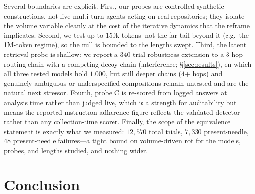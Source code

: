 \documentclass[11pt]{article}
\begin{document}
Several boundaries are explicit. First, our probes are controlled synthetic
constructions, not live multi-turn agents acting on real repositories; they isolate
the volume variable cleanly at the cost of the iterative dynamics that the reframe
implicates. Second, we test up to $150$k tokens, not the far tail beyond it
(e.g.\ the 1M-token regime), so the null is bounded to the lengths swept. Third, the
latent retrieval probe is shallow: we report a $340$-trial robustness extension to a
$3$-hop routing chain with a competing decoy chain (interference; \S\ref{sec:results}),
on which all three tested models hold $1.000$, but still deeper chains ($4$+ hops) and
genuinely ambiguous or underspecified compositions remain untested and are the natural
next stressor. Fourth, probe C is
re-scored from logged answers at analysis time rather than judged live, which is a
strength for auditability but means the reported instruction-adherence figure
reflects the validated detector rather than any collection-time scorer. Finally, the scope of the
equivalence statement is exactly what we measured: $12{,}570$ total trials, $7{,}330$
present-needle, $48$ present-needle failures---a tight bound on volume-driven rot for
the models, probes, and lengths studied, and nothing wider.

\section{Conclusion}
\label{sec:conclusion}
\end{document}
